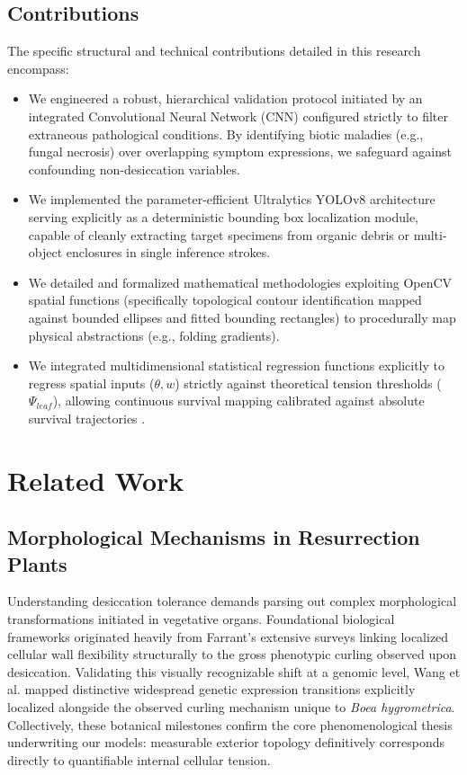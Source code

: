 \documentclass[conference]{IEEEtran}
\begin{document}
\subsection{Contributions}
The specific structural and technical contributions detailed in this research encompass:
\begin{itemize}
    \item We engineered a robust, hierarchical validation protocol initiated by an integrated Convolutional Neural Network (CNN) configured strictly to filter extraneous pathological conditions. By identifying biotic maladies (e.g., fungal necrosis) over overlapping symptom expressions, we safeguard against confounding non-desiccation variables.
    \item We implemented the parameter-efficient Ultralytics YOLOv8 architecture \cite{yolo8} serving explicitly as a deterministic bounding box localization module, capable of cleanly extracting target specimens from organic debris or multi-object enclosures in single inference strokes.
    \item We detailed and formalized mathematical methodologies exploiting OpenCV spatial functions (specifically topological contour identification mapped against bounded ellipses and fitted bounding rectangles) to procedurally map physical abstractions (e.g., folding gradients).
    \item We integrated multidimensional statistical regression functions explicitly to regress spatial inputs ($\theta, w$) strictly against theoretical tension thresholds ($\Psi_{leaf}$), allowing continuous survival mapping calibrated against absolute survival trajectories \cite{internal_paper}.
\end{itemize}

\section{Related Work}

\subsection{Morphological Mechanisms in Resurrection Plants}
Understanding desiccation tolerance demands parsing out complex morphological transformations initiated in vegetative organs. Foundational biological frameworks originated heavily from Farrant’s \cite{farrant} extensive surveys linking localized cellular wall flexibility structurally to the gross phenotypic curling observed upon desiccation. Validating this visually recognizable shift at a genomic level, Wang et al. \cite{wang} mapped distinctive widespread genetic expression transitions explicitly localized alongside the observed curling mechanism unique to \textit{Boea hygrometrica}. Collectively, these botanical milestones confirm the core phenomenological thesis underwriting our models: measurable exterior topology definitively corresponds directly to quantifiable internal cellular tension.
\end{document}
